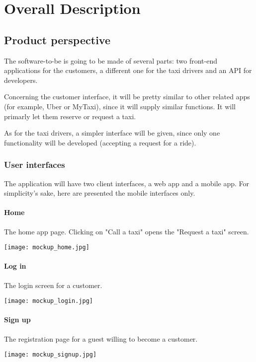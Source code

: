 \pagebreak
\section{Overall Description}
\subsection{Product perspective}

The software-to-be is going to be made of several parts: two front-end applications for the customers, a different one for the taxi drivers and an API for developers. 

Concerning the customer interface, it will be pretty similar to other related apps (for example, Uber or MyTaxi), since it will supply similar functions. It will primarly let them reserve or request a taxi.

As for the taxi drivers, a simpler interface will be given, since only one functionality will be developed (accepting a request for a ride).
 
\subsubsection{User interfaces}
The application will have two client interfaces, a web app and a mobile app. For simplicity's sake, here are presented the mobile interfaces only.

\pagebreak
\paragraph{Home}
The home app page. Clicking on "Call a taxi" opens the "Request a taxi" screen.
\begin{center}
\texttt{[image: mockup\_home.jpg]}
\end{center}

\pagebreak
\paragraph{Log in}
The login screen for a customer.
\begin{center}
\texttt{[image: mockup\_login.jpg]}
\end{center}

\pagebreak
\paragraph{Sign up}
The registration page for a guest willing to become a customer.
\begin{center}
\texttt{[image: mockup\_signup.jpg]}
\end{center}


